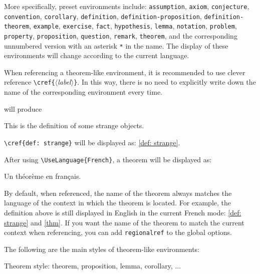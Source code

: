 \documentclass[allowbf]{colorart}
\providecommand{\meta}[1]{$\langle${\normalfont\itshape#1}$\rangle$}
\newenvironment{remind}[1][Remind]{%
    \begin{tcolorbox}[breakable,
        enhanced,
        width = \textwidth,
        colback = white, colbacktitle = paper,
        colframe = gray!50, boxrule=0.2mm,
        coltitle = black,
        fonttitle = \sffamily,
        attach boxed title to top left = {yshift=-\tcboxedtitleheight/2,  xshift=\tcboxedtitlewidth/4},
        boxed title style = {boxrule=0pt, colframe=paper},
        before skip = 0.3cm,
        after skip = 0.3cm,
        top = 3mm,
        bottom = 3mm,
        title={\sffamily #1}]%
}{\end{tcolorbox}}
\begin{document}
More specifically, preset environments include: 
\texttt{assumption}, \texttt{axiom}, \texttt{conjecture}, \texttt{convention}, \texttt{corollary}, \texttt{definition}, \texttt{definition-proposition}, \texttt{definition-theorem}, \texttt{example}, \texttt{exercise}, \texttt{fact}, \texttt{hypothesis}, \texttt{lemma}, \texttt{notation}, \texttt{problem}, \texttt{property}, \texttt{proposition}, \texttt{question}, \texttt{remark}, \texttt{theorem}, and the corresponding unnumbered version with an asterisk \lstinline|*| in the name. The display of these environments will change according to the current language.

\medskip
When referencing a theorem-like environment, it is recommended to use clever reference \lstinline|\cref{|\meta{label}\texttt{\}}. In this way, there is no need to explicitly write down the name of the corresponding environment every time.

\begin{remind}[Example]

\lstinline|\cref{def: strange}| will be displayed as: \cref{def: strange}.

\medskip
After using \lstinline|\UseLanguage{French}|, a theorem will be displayed as:

\begin{theorem}[Inutile]\label{thm}
    Un théorème en français.
\end{theorem}

By default, when referenced, the name of the theorem always matches the language of the context in which the theorem is located. For example, the definition above is still displayed in English in the current French mode: \cref{def: strange} and \cref{thm}. If you want the name of the theorem to match the current context when referencing, you can add \texttt{regionalref} to the global options.
\end{remind}


\clearpage %
The following are the main styles of theorem-like environments:
\begin{theorem}
    Theorem style: theorem, proposition, lemma, corollary, ...
\end{theorem}
\end{document}
